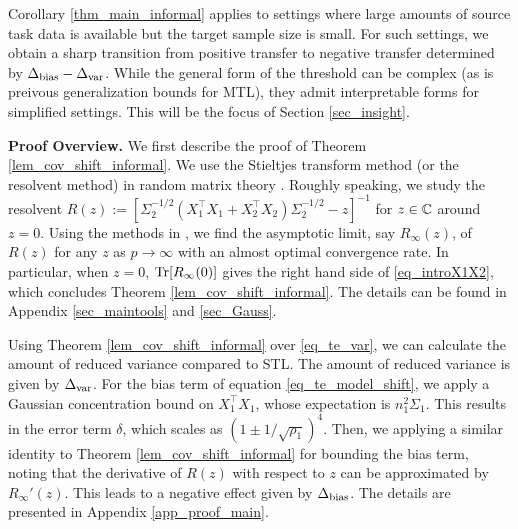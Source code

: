 Corollary \ref{thm_main_informal} applies to settings where large amounts of source task data is available but the target sample size is small.
For such settings, we obtain a sharp transition from positive transfer to negative transfer determined by $\Delta_{\text{bias}} - \Delta_{\text{var}}$.
While the general form of the threshold can be complex (as is preivous generalization bounds for MTL), they admit interpretable forms for simplified settings.
This will be the focus of Section \ref{sec_insight}.


\textbf{Proof Overview.} We first describe the proof of Theorem \ref{lem_cov_shift_informal}.
We use the Stieltjes transform method (or the resolvent method) in random matrix theory \cite{bai2009spectral,tao2012topics,erdos2017dynamical}. Roughly speaking, we study the resolvent $R(z):=[\Sigma_2^{-1/2}( X_1^{\top}X_1 + X_2^{\top}X_2)\Sigma_2^{-1/2}-z]^{-1}$ for $z\in \mathbb{C}$ around $z=0$.
Using the methods in \cite{Anisotropic,yang2019spiked}, we find the asymptotic limit, say $R_\infty(z)$, of $R(z)$ for any $z$ as $p\to \infty$ with an almost optimal convergence rate. In particular, when $z=0$, $\operatorname{Tr}[R_\infty(0)]$ gives the right hand side of \eqref{eq_introX1X2}, which concludes Theorem \ref{lem_cov_shift_informal}. The details can be found in Appendix \ref{sec_maintools} and \ref{sec_Gauss}.

Using Theorem \ref{lem_cov_shift_informal} over \eqref{eq_te_var}, we can calculate the amount of reduced variance compared to STL.
The amount of reduced variance is given by $\Delta_{\text{var}}$.
For the bias term of equation \eqref{eq_te_model_shift}, we apply a Gaussian concentration bound on $X_1^{\top}X_1$, whose expectation is $n_1^2\Sigma_1$.
This results in the error term $\delta$, which scales as $(1 \pm 1/\sqrt{\rho_1})^4$.
Then, we applying a similar identity to Theorem \ref{lem_cov_shift_informal} for bounding the bias term, noting that the derivative of $R(z)$ with respect to $z$ can be approximated by $R_\infty'(z)$.
This leads to a negative effect given by $\Delta_{\text{bias}}$. %
The details are presented in Appendix \ref{app_proof_main}.

